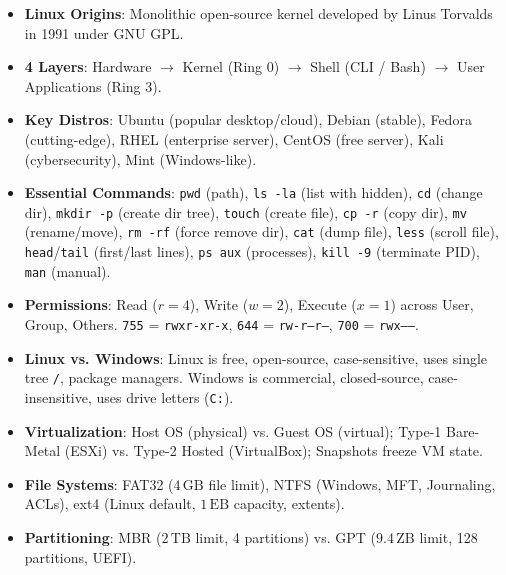 \begin{quickrevision}
\begin{itemize}
    \item \textbf{Linux Origins}: Monolithic open-source kernel developed by Linus Torvalds in 1991 under GNU GPL.
    \item \textbf{4 Layers}: Hardware $\rightarrow$ Kernel (Ring 0) $\rightarrow$ Shell (CLI / Bash) $\rightarrow$ User Applications (Ring 3).
    \item \textbf{Key Distros}: Ubuntu (popular desktop/cloud), Debian (stable), Fedora (cutting-edge), RHEL (enterprise server), CentOS (free server), Kali (cybersecurity), Mint (Windows-like).
    \item \textbf{Essential Commands}: \texttt{pwd} (path), \texttt{ls -la} (list with hidden), \texttt{cd} (change dir), \texttt{mkdir -p} (create dir tree), \texttt{touch} (create file), \texttt{cp -r} (copy dir), \texttt{mv} (rename/move), \texttt{rm -rf} (force remove dir), \texttt{cat} (dump file), \texttt{less} (scroll file), \texttt{head}/\texttt{tail} (first/last lines), \texttt{ps aux} (processes), \texttt{kill -9} (terminate PID), \texttt{man} (manual).
    \item \textbf{Permissions}: Read ($r=4$), Write ($w=2$), Execute ($x=1$) across User, Group, Others. \texttt{755} = \texttt{rwxr-xr-x}, \texttt{644} = \texttt{rw-r--r--}, \texttt{700} = \texttt{rwx------}.
    \item \textbf{Linux vs. Windows}: Linux is free, open-source, case-sensitive, uses single tree \texttt{/}, package managers. Windows is commercial, closed-source, case-insensitive, uses drive letters (\texttt{C:}).
    \item \textbf{Virtualization}: Host OS (physical) vs. Guest OS (virtual); Type-1 Bare-Metal (ESXi) vs. Type-2 Hosted (VirtualBox); Snapshots freeze VM state.
    \item \textbf{File Systems}: FAT32 ($4\,\text{GB}$ file limit), NTFS (Windows, MFT, Journaling, ACLs), ext4 (Linux default, $1\,\text{EB}$ capacity, extents).
    \item \textbf{Partitioning}: MBR ($2\,\text{TB}$ limit, 4 partitions) vs. GPT ($9.4\,\text{ZB}$ limit, 128 partitions, UEFI).
\end{itemize}
\end{quickrevision}

